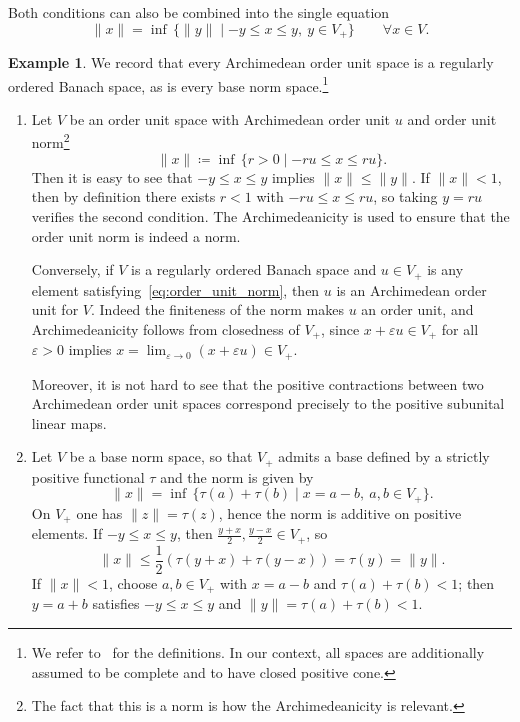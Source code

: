 \documentclass[11pt,onecolumn]{article}
\theoremstyle{plain}
\theoremstyle{remark}
\theoremstyle{definition}
\newtheorem{example}[example]{Example}
\begin{document}
Both conditions can also be combined into the single equation
\[
	\|x\| = \inf \, \{\|y\| \mid -y \le x \le y,\ y \in V_+\} \qquad \forall x \in V.
\]

\begin{example}
\label{ex:aous}
	We record that every Archimedean order unit space is a regularly ordered Banach space, as is every base norm space.\footnote{We refer to~\cite{Nagel} for the definitions. In our context, all spaces are additionally assumed to be complete and to have closed positive cone.}
	\begin{enumerate}
		\item Let $V$ be an order unit space with Archimedean order unit $u$ and order unit norm\footnote{The fact that this is a norm is how the Archimedeanicity is relevant.}
			\begin{equation}
				\label{eq:order_unit_norm}
				\|x\| \coloneqq \inf \, \{r > 0 \mid -ru \le x \le ru\}.
			\end{equation}
			Then it is easy to see that $-y \le x \le y$ implies $\|x\| \le \|y\|$.
			If $\|x\| < 1$, then by definition there exists $r < 1$ with $-ru \le x \le ru$, so taking $y = ru$ verifies the second condition.
			The Archimedeanicity is used to ensure that the order unit norm is indeed a norm.

			Conversely, if $V$ is a regularly ordered Banach space and $u \in V_+$ is any element satisfying~\eqref{eq:order_unit_norm}, then $u$ is an Archimedean order unit for $V$.
			Indeed the finiteness of the norm makes $u$ an order unit, and Archimedeanicity follows from closedness of $V_+$, since $x + \varepsilon u \in V_+$ for all $\varepsilon > 0$ implies $x = \lim_{\varepsilon \to 0} (x + \varepsilon u) \in V_+$.

			Moreover, it is not hard to see that the positive contractions between two Archimedean order unit spaces correspond precisely to the positive subunital linear maps.
		\item Let $V$ be a base norm space, so that $V_+$ admits a base defined by a strictly positive functional $\tau$ and the norm is given by
			\[
				\|x\| = \inf \, \{\tau(a) + \tau(b) \mid x = a - b,\ a,b \in V_+\}.
			\]
			On $V_+$ one has $\|z\| = \tau(z)$, hence the norm is additive on positive elements.
			If $-y \le x \le y$, then $\frac{y+x}{2},\frac{y-x}{2} \in V_+$, so
			\[
				\|x\| \le  \frac{1}{2}(\tau(y+x) + \tau(y-x)) = \tau(y) = \|y\|.
			\]
			If $\|x\| < 1$, choose $a,b \in V_+$ with $x = a - b$ and $\tau(a) + \tau(b) < 1$; then $y = a+b$ satisfies $-y \le x \le y$ and $\|y\| = \tau(a) + \tau(b) < 1$.
	\end{enumerate}
\end{example}
\end{document}
